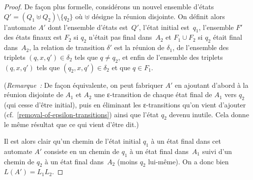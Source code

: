 \documentclass[12pt,a4paper]{article}
\theoremstyle{definition}
\begin{document}
\begin{proof}
De façon plus formelle, considérons un nouvel ensemble d'états $Q' =
(Q_1 \uplus Q_2) \setminus \{q_2\}$ où $\uplus$ désigne la réunion
disjointe.  On définit alors l'automate $A'$ dont l'ensemble d'états
est $Q'$, l'état initial est $q_1$, l'ensemble $F'$ des états finaux
est $F_2$ si $q_2$ n'était pas final dans $A_2$ et $F_1 \cup F_2$ si
$q_2$ était final dans $A_2$, la relation de transition $\delta'$
est la réunion de $\delta_1$, de l'ensemble des triplets $(q,x,q') \in
\delta_2$ tels que $q\neq q_2$, et enfin de l'ensemble des triplets
$(q,x,q')$ tels que $(q_2,x,q') \in \delta_2$ et que $q\in F_1$.

(\emph{Remarque : } De façon équivalente, on peut fabriquer $A'$ en
ajoutant d'abord à la réunion disjointe de $A_1$ et $A_2$ une
ε-transition de chaque état final de $A_1$ vers $q_2$ (qui cesse
d'être initial), puis en éliminant les ε-transitions qu'on vient
d'ajouter (cf. \ref{removal-of-epsilon-transitions}) ainsi que l'état
$q_2$ devenu inutile.  Cela donne le même résultat que ce qui vient
d'être dit.)

Il est alors clair qu'un chemin de l'état initial $q_1$ à un état
final dans cet automate $A'$ consiste en un chemin de $q_1$ à un état
final dans $A_1$ suivi d'un chemin de $q_2$ à un état final dans $A_2$
(moins $q_2$ lui-même).  On a donc bien $L(A') = L_1 L_2$.
\end{proof}
\end{document}

